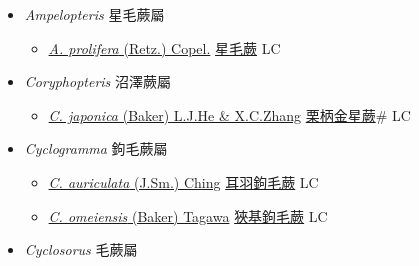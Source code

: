 
  \begin{itemize}
 \item[] \textit{Ampelopteris} 星毛蕨屬
                    
  \begin{itemize}
        \item[] \href{http://www.theplantlist.org/tpl1.1/search?q=Ampelopteris+prolifera}{\textit{A. prolifera} (Retz.) Copel.}   \href{\detokenize{http://taibnet.sinica.edu.tw/chi/taibnet_species_list.php?T2=星毛蕨&T2_new_value=true&fr=y}}{星毛蕨} LC
  \end{itemize}
 \item[] \textit{Coryphopteris} 沼澤蕨屬
                    
  \begin{itemize}
        \item[] \href{http://www.theplantlist.org/tpl1.1/search?q=Coryphopteris+japonica}{\textit{C. japonica} (Baker) L.J.He \& X.C.Zhang}     \href{\detokenize{http://taibnet.sinica.edu.tw/chi/taibnet_species_list.php?T2=栗柄金星蕨&T2_new_value=true&fr=y}}{栗柄金星蕨}\# LC
  \end{itemize}
 \item[] \textit{Cyclogramma} 鉤毛蕨屬
                    
  \begin{itemize}
        \item[] \href{http://www.theplantlist.org/tpl1.1/search?q=Cyclogramma+auriculata}{\textit{C. auriculata} (J.Sm.) Ching}     \href{\detokenize{http://taibnet.sinica.edu.tw/chi/taibnet_species_list.php?T2=耳羽鉤毛蕨&T2_new_value=true&fr=y}}{耳羽鉤毛蕨} LC
        \item[] \href{http://www.theplantlist.org/tpl1.1/search?q=Cyclogramma+omeiensis}{\textit{C. omeiensis} (Baker) Tagawa}     \href{\detokenize{http://taibnet.sinica.edu.tw/chi/taibnet_species_list.php?T2=狹基鉤毛蕨&T2_new_value=true&fr=y}}{狹基鉤毛蕨} LC
  \end{itemize}
 \item[] \textit{Cyclosorus} 毛蕨屬
                    

\end{itemize}
